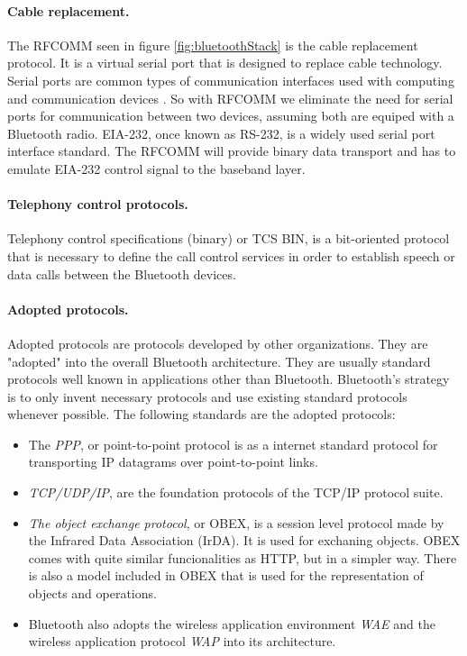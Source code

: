 \documentclass[a4paper, 11pt]{report}
\begin{document}
		\paragraph{Cable replacement.}
The RFCOMM seen in figure \ref{fig:bluetoothStack} is the cable replacement protocol. It is a virtual serial port that is designed to replace cable technology. Serial ports are common types of communication interfaces used with computing and communication devices \cite{introBluetooth}. So with RFCOMM we eliminate the need for serial ports for communication between two devices, assuming both are equiped with a Bluetooth radio. 
EIA-232, once known as RS-232, is a widely used serial port interface standard. The RFCOMM will provide binary data transport and has to emulate EIA-232 control signal to the baseband layer.

		\paragraph{Telephony control protocols.}
Telephony control specifications (binary) or TCS BIN, is a bit-oriented protocol that is necessary to define the call control services in order to establish speech or data calls between the Bluetooth devices.

		\paragraph{Adopted protocols.}
Adopted protocols are protocols developed by other organizations. They are "adopted" into the overall Bluetooth architecture. They are usually standard protocols well known in applications other than Bluetooth. Bluetooth's strategy is to only invent necessary protocols and use existing standard protocols whenever possible. The following standards are the adopted protocols:

	\begin{itemize}
		\item The \textit{PPP}, or point-to-point protocol is as a internet standard protocol for transporting IP datagrams over point-to-point links.
		\item \textit{TCP/UDP/IP}, are the foundation protocols of the TCP/IP protocol suite.
		\item \textit{The object exchange protocol}, or OBEX, is a session level protocol made by the Infrared Data Association (IrDA). It is used for exchaning objects. OBEX comes with quite similar funcionalities as HTTP, but in a simpler way. There is also a model included in OBEX that is used for the representation of objects and operations.
		\item Bluetooth also adopts the wireless application environment \textit{WAE} and the wireless application protocol \textit{WAP} into its architecture.	
	\end{itemize}
\end{document}
